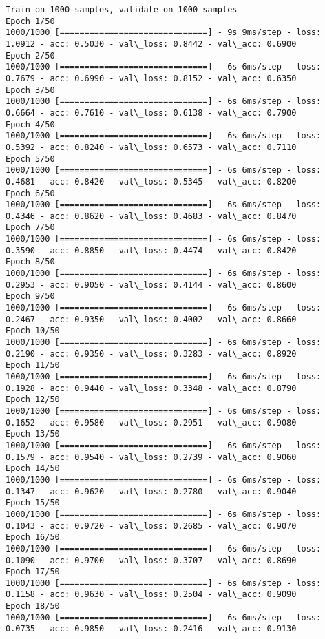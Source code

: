 \documentclass[11pt]{article}
\begin{document}
    \begin{Verbatim}[commandchars=\\\{\}]
Train on 1000 samples, validate on 1000 samples
Epoch 1/50
1000/1000 [==============================] - 9s 9ms/step - loss: 1.0912 - acc: 0.5030 - val\_loss: 0.8442 - val\_acc: 0.6900
Epoch 2/50
1000/1000 [==============================] - 6s 6ms/step - loss: 0.7679 - acc: 0.6990 - val\_loss: 0.8152 - val\_acc: 0.6350
Epoch 3/50
1000/1000 [==============================] - 6s 6ms/step - loss: 0.6664 - acc: 0.7610 - val\_loss: 0.6138 - val\_acc: 0.7900
Epoch 4/50
1000/1000 [==============================] - 6s 6ms/step - loss: 0.5392 - acc: 0.8240 - val\_loss: 0.6573 - val\_acc: 0.7110
Epoch 5/50
1000/1000 [==============================] - 6s 6ms/step - loss: 0.4681 - acc: 0.8420 - val\_loss: 0.5345 - val\_acc: 0.8200
Epoch 6/50
1000/1000 [==============================] - 6s 6ms/step - loss: 0.4346 - acc: 0.8620 - val\_loss: 0.4683 - val\_acc: 0.8470
Epoch 7/50
1000/1000 [==============================] - 6s 6ms/step - loss: 0.3590 - acc: 0.8850 - val\_loss: 0.4474 - val\_acc: 0.8420
Epoch 8/50
1000/1000 [==============================] - 6s 6ms/step - loss: 0.2953 - acc: 0.9050 - val\_loss: 0.4144 - val\_acc: 0.8600
Epoch 9/50
1000/1000 [==============================] - 6s 6ms/step - loss: 0.2467 - acc: 0.9350 - val\_loss: 0.4002 - val\_acc: 0.8660
Epoch 10/50
1000/1000 [==============================] - 6s 6ms/step - loss: 0.2190 - acc: 0.9350 - val\_loss: 0.3283 - val\_acc: 0.8920
Epoch 11/50
1000/1000 [==============================] - 6s 6ms/step - loss: 0.1928 - acc: 0.9440 - val\_loss: 0.3348 - val\_acc: 0.8790
Epoch 12/50
1000/1000 [==============================] - 6s 6ms/step - loss: 0.1652 - acc: 0.9580 - val\_loss: 0.2951 - val\_acc: 0.9080
Epoch 13/50
1000/1000 [==============================] - 6s 6ms/step - loss: 0.1579 - acc: 0.9540 - val\_loss: 0.2739 - val\_acc: 0.9060
Epoch 14/50
1000/1000 [==============================] - 6s 6ms/step - loss: 0.1347 - acc: 0.9620 - val\_loss: 0.2780 - val\_acc: 0.9040
Epoch 15/50
1000/1000 [==============================] - 6s 6ms/step - loss: 0.1043 - acc: 0.9720 - val\_loss: 0.2685 - val\_acc: 0.9070
Epoch 16/50
1000/1000 [==============================] - 6s 6ms/step - loss: 0.1090 - acc: 0.9700 - val\_loss: 0.3707 - val\_acc: 0.8690
Epoch 17/50
1000/1000 [==============================] - 6s 6ms/step - loss: 0.1158 - acc: 0.9630 - val\_loss: 0.2504 - val\_acc: 0.9090
Epoch 18/50
1000/1000 [==============================] - 6s 6ms/step - loss: 0.0735 - acc: 0.9850 - val\_loss: 0.2416 - val\_acc: 0.9130

\end{Verbatim}
\end{document}
